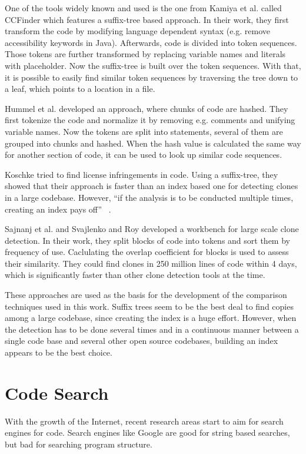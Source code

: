 One of the tools widely known and used is the one from Kamiya et al. called CCFinder \cite{kamiya2002ccfinder} which features a suffix-tree based approach.
In their work, they first transform the code by modifying language dependent syntax (e.g. remove accessibility keywords in Java).
Afterwards, code is divided into token sequences.
Those tokens are further transformed by replacing variable names and literals with placeholder.
Now the suffix-tree is built over the token sequences. 
With that, it is possible to easily find similar token sequences by traversing the tree down to a leaf, which points to a location in a file.

Hummel et al.\cite{hummel2010index} developed an approach, where chunks of code are hashed.
They first tokenize the code and normalize it by removing e.g. comments and unifying variable names.
Now the tokens are split into statements, several of them are grouped into chunks and hashed.
When the hash value is calculated the same way for another section of code, it can be used to look up similar code sequences.

Koschke \cite{koschke2014large,koschke2012large} tried to find license infringements in code.
Using a suffix-tree, they showed that their approach is faster than an index based one for detecting clones in a large codebase.
However, ``if the analysis is to be conducted multiple times, creating an index pays off'' \ \cite{koschke2014large}.

Sajnanj et al. \cite{sajnani2016sourcerercc} and Svajlenko and Roy \cite{svajlenko2017fast} developed a workbench for large scale clone detection.
In their work, they split blocks of code into tokens and sort them by frequency of use.
Caclulating the overlap coefficient for blocks is used to assess their similarity.
They could find clones in 250 million lines of code within 4 days, which is significantly faster than other clone detection tools at the time.

These approaches are used as the basis for the development of the comparison techniques used in this work.
Suffix trees seem to be the best deal to find copies among a large codebase, since creating the index is a huge effort.
However, when the detection has to be done several times and in a continuous manner between a single code base and several other open source codebases, building an index appears to be the best choice.

\section{Code Search}\label{section:related_work/code_search}
With the growth of the Internet, recent research areas start to aim for search engines for code.
Search engines like Google are good for string based searches, but bad for searching program structure.

